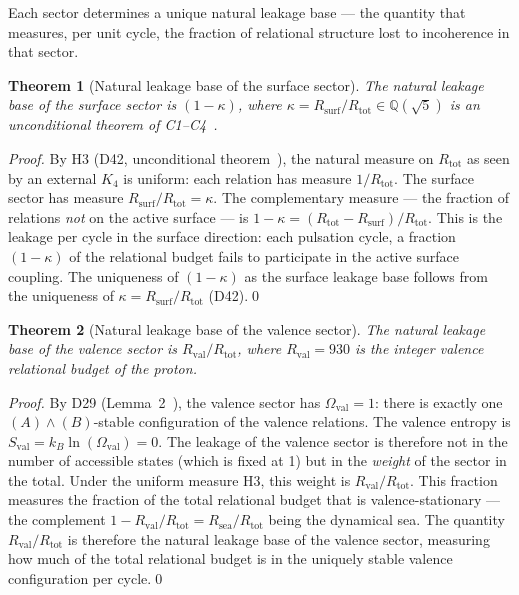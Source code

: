 \documentclass[12pt,a4paper]{article}
\newtheorem{theorem}{Theorem}[section]
\newcommand{\Kfour}{K_4}
\newcommand{\Rsurf}{R_{\mathrm{surf}}}
\newcommand{\Rtot}{R_{\mathrm{tot}}}
\newcommand{\Rval}{R_{\mathrm{val}}}
\newcommand{\Rsea}{R_{\mathrm{sea}}}
\newcommand{\kap}{\kappa}
\newcommand{\Ov}{\Omega_{\mathrm{val}}}
\begin{document}
Each sector determines a unique natural leakage base — the quantity that measures, per unit cycle, the fraction of relational structure lost to incoherence in that sector.

\begin{theorem}[Natural leakage base of the surface sector]
\label{thm:base_surf}
The natural leakage base of the surface sector is $(1-\kap)$, where $\kap = \Rsurf/\Rtot \in \mathbb{Q}(\sqrt{5})$ is an unconditional theorem of C1--C4~\cite{PDL_D42_2026}.
\end{theorem}

\begin{proof}
By H3 (D42, unconditional theorem~\cite{PDL_D42_2026}), the natural measure on $\Rtot$ as seen by an external $\Kfour$ is uniform: each relation has measure $1/\Rtot$. The surface sector has measure $\Rsurf/\Rtot = \kap$. The complementary measure — the fraction of relations \emph{not} on the active surface — is $1-\kap = (R_\mathrm{tot} - \Rsurf)/\Rtot$. This is the leakage per cycle in the surface direction: each pulsation cycle, a fraction $(1-\kap)$ of the relational budget fails to participate in the active surface coupling. The uniqueness of $(1-\kap)$ as the surface leakage base follows from the uniqueness of $\kap = \Rsurf/\Rtot$ (D42).\qed
\end{proof}

\begin{theorem}[Natural leakage base of the valence sector]
\label{thm:base_val}
The natural leakage base of the valence sector is $\Rval/\Rtot$, where $\Rval = 930$ is the integer valence relational budget of the proton.
\end{theorem}

\begin{proof}
By D29 (Lemma~2~\cite{PDL_D29_2026}), the valence sector has $\Ov = 1$: there is exactly one $(A)\wedge(B)$-stable configuration of the valence relations. The valence entropy is $S_\mathrm{val} = k_B\ln(\Ov) = 0$. The leakage of the valence sector is therefore not in the number of accessible states (which is fixed at 1) but in the \emph{weight} of the sector in the total. Under the uniform measure H3, this weight is $\Rval/\Rtot$. This fraction measures the fraction of the total relational budget that is valence-stationary — the complement $1 - \Rval/\Rtot = \Rsea/\Rtot$ being the dynamical sea. The quantity $\Rval/\Rtot$ is therefore the natural leakage base of the valence sector, measuring how much of the total relational budget is in the uniquely stable valence configuration per cycle.\qed
\end{proof}
\end{document}
